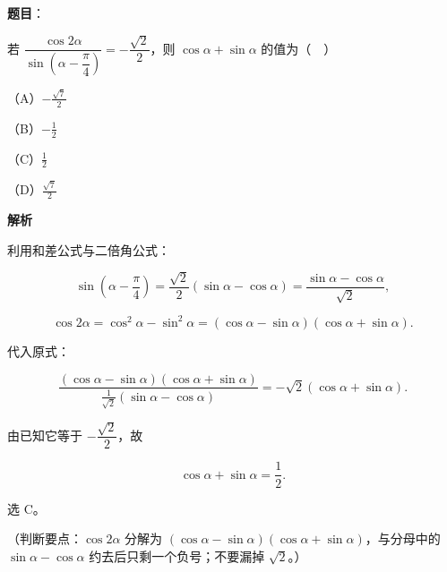 \begin{answer}

\textbf{题目}：

若 $\dfrac{\cos2\alpha}{\sin\left(\alpha-\dfrac{\pi}{4}\right)}=-\dfrac{\sqrt2}{2}$，则 $\cos\alpha+\sin\alpha$ 的值为（　）

（A）$-\frac{\sqrt7}{2}$

（B）$-\frac12$

（C）$\frac12$

（D）$\frac{\sqrt7}{2}$

\textbf{解析}

利用和差公式与二倍角公式：

\nopagebreak[4]
\[\sin\left(\alpha-\frac{\pi}{4}\right)=\frac{\sqrt2}{2}(\sin\alpha-\cos\alpha)=\frac{\sin\alpha-\cos\alpha}{\sqrt2},\]

\nopagebreak[4]
\[\cos2\alpha=\cos^2\alpha-\sin^2\alpha=(\cos\alpha-\sin\alpha)(\cos\alpha+\sin\alpha).\]

代入原式：

\nopagebreak[4]
\[\frac{(\cos\alpha-\sin\alpha)(\cos\alpha+\sin\alpha)}{\frac{1}{\sqrt2}(\sin\alpha-\cos\alpha)}=-\sqrt2(\cos\alpha+\sin\alpha).\]

由已知它等于 $-\dfrac{\sqrt2}{2}$，故

\nopagebreak[4]
\[\cos\alpha+\sin\alpha=\frac12.\]

选 C。

（判断要点：$\cos2\alpha$ 分解为 $(\cos\alpha-\sin\alpha)(\cos\alpha+\sin\alpha)$，与分母中的 $\sin\alpha-\cos\alpha$ 约去后只剩一个负号；不要漏掉 $\sqrt2$。）


\end{answer}
